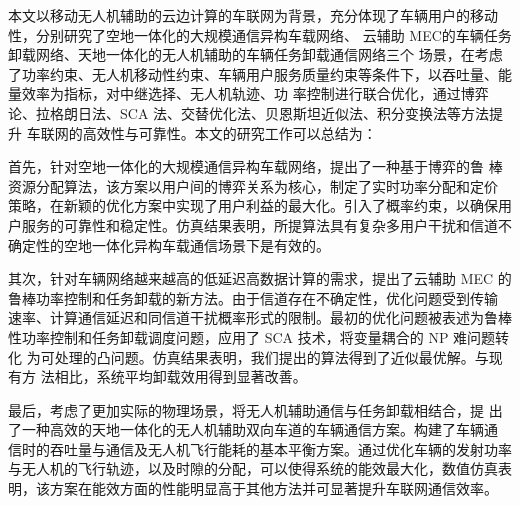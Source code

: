 \makeatletter
{}
  \pagestyle{fancy}%
  \fancyhf{}
\makeatother

\begin{conclusion} \label{chap:conclusion}
\textcolor[RGB]{18,20,168}{}本文以移动无人机辅助的云边计算的车联网为背景，充分体现了车辆用户的移动性，分别研究了空地一体化的大规模通信异构车载网络、
云辅助 MEC的车辆任务卸载网络、天地一体化的无人机辅助的车辆任务卸载通信网络三个
场景，在考虑了功率约束、无人机移动性约束、车辆用户服务质量约束等条件下，以吞吐量、能量效率为指标，对中继选择、无人机轨迹、功
率控制进行联合优化，通过博弈论、拉格朗日法、SCA 法、交替优化法、贝恩斯坦近似法、积分变换法等方法提升
车联网的高效性与可靠性。本文的研究工作可以总结为：

首先，针对空地一体化的大规模通信异构车载网络，提出了一种基于博弈的鲁
棒资源分配算法，该方案以用户间的博弈关系为核心，制定了实时功率分配和定价
策略，在新颖的优化方案中实现了用户利益的最大化。引入了概率约束，以确保用
户服务的可靠性和稳定性。仿真结果表明，所提算法具有复杂多用户干扰和信道不
确定性的空地一体化异构车载通信场景下是有效的。

其次，针对车辆网络越来越高的低延迟高数据计算的需求，提出了云辅助 MEC
的鲁棒功率控制和任务卸载的新方法。由于信道存在不确定性，优化问题受到传输
速率、计算通信延迟和同信道干扰概率形式的限制。最初的优化问题被表述为鲁棒
性功率控制和任务卸载调度问题，应用了 SCA 技术，将变量耦合的 NP 难问题转化
为可处理的凸问题。仿真结果表明，我们提出的算法得到了近似最优解。与现有方
法相比，系统平均卸载效用得到显著改善。

最后，考虑了更加实际的物理场景，将无人机辅助通信与任务卸载相结合，提
出了一种高效的天地一体化的无人机辅助双向车道的车辆通信方案。构建了车辆通
信时的吞吐量与通信及无人机飞行能耗的基本平衡方案。通过优化车辆的发射功率
与无人机的飞行轨迹，以及时隙的分配，可以使得系统的能效最大化，数值仿真表
明，该方案在能效方面的性能明显高于其他方法并可显著提升车联网通信效率。


\end{conclusion}
